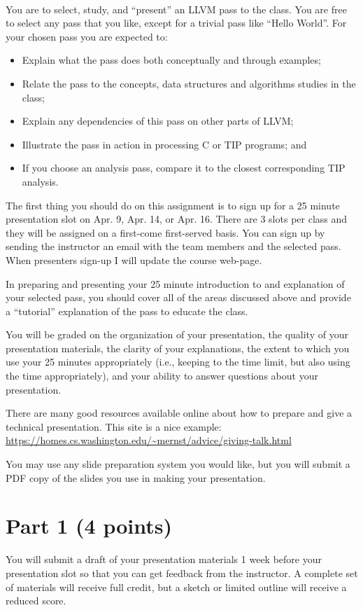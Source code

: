 \documentclass[12pt,letterpaper]{article}
\begin{document}
~

You are to select, study, and ``present'' an LLVM pass to the class.
You are free to select any pass that you like, except for a trivial
pass like ``Hello World''.
For your chosen pass you are expected to:
\begin{itemize}
\item Explain what the pass does both conceptually and through examples;
\item Relate the pass to the concepts, data structures and algorithms studies in the class;
\item Explain any dependencies of this pass on other parts of LLVM;
\item Illustrate the pass in action in processing C or TIP programs; and
\item If you choose an analysis pass, compare it to the closest corresponding TIP analysis. 
\end{itemize}

The first thing you should do on this assignment is to sign up for
a 25 minute presentation slot on Apr. 9, Apr. 14, or Apr. 16.  There are
3 slots per class and they will be assigned on a first-come first-served
basis.  
You can sign up by sending the instructor an email with the 
team members and the selected pass.  
When presenters sign-up I will update the course web-page.

In preparing and presenting your 25 minute introduction 
to and explanation of your selected pass, you should cover all 
of the areas discussed above and 
provide a ``tutorial'' explanation of the pass to educate the class.

You will be graded on the organization of your presentation,
the quality of your presentation materials,
the clarity of your explanations,
the extent to which you use your 25 minutes appropriately (i.e., keeping
to the time limit, but also using the time appropriately),
and your ability to answer questions about your presentation. 

There are many good resources available online about how to prepare
and give a technical presentation.  This site is a nice example:
\url{https://homes.cs.washington.edu/~mernst/advice/giving-talk.html}

You may use any slide preparation system you would like, but you 
will submit a PDF copy of the slides you use in making your presentation.

\section*{Part 1 (4 points)}
You will submit a draft of your presentation materials 1 week before
your presentation slot so that you can get feedback from the instructor.
A complete set of materials will receive full credit, but a sketch or
limited outline will receive a reduced score.
\end{document}

